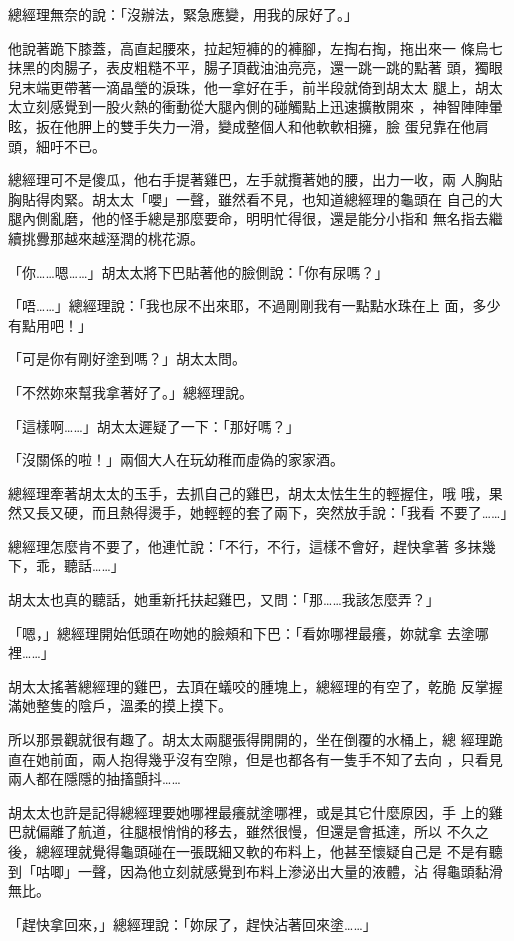 總經理無奈的說：「沒辦法，緊急應變，用我的尿好了。」

他說著跪下膝蓋，高直起腰來，拉起短褲的的褲腳，左掏右掏，拖出來一
條烏七抹黑的肉腸子，表皮粗糙不平，腸子頂截油油亮亮，還一跳一跳的點著
頭，獨眼兒末端更帶著一滴晶瑩的淚珠，他一拿好在手，前半段就倚到胡太太
腿上，胡太太立刻感覺到一股火熱的衝動從大腿內側的碰觸點上迅速擴散開來
，神智陣陣暈眩，扳在他胛上的雙手失力一滑，變成整個人和他軟軟相擁，臉
蛋兒靠在他肩頭，細吁不已。

總經理可不是傻瓜，他右手提著雞巴，左手就攬著她的腰，出力一收，兩
人胸貼胸貼得肉緊。胡太太「嚶」一聲，雖然看不見，也知道總經理的龜頭在
自己的大腿內側亂磨，他的怪手總是那麼要命，明明忙得很，還是能分小指和
無名指去繼續挑釁那越來越溼潤的桃花源。

「你……嗯……」胡太太將下巴貼著他的臉側說：「你有尿嗎？」

「唔……」總經理說：「我也尿不出來耶，不過剛剛我有一點點水珠在上
面，多少有點用吧！」

「可是你有剛好塗到嗎？」胡太太問。

「不然妳來幫我拿著好了。」總經理說。

「這樣啊……」胡太太遲疑了一下：「那好嗎？」

「沒關係的啦！」兩個大人在玩幼稚而虛偽的家家酒。

總經理牽著胡太太的玉手，去抓自己的雞巴，胡太太怯生生的輕握住，哦
哦，果然又長又硬，而且熱得燙手，她輕輕的套了兩下，突然放手說：「我看
不要了……」

總經理怎麼肯不要了，他連忙說：「不行，不行，這樣不會好，趕快拿著
多抹幾下，乖，聽話……」

胡太太也真的聽話，她重新托扶起雞巴，又問：「那……我該怎麼弄？」

「嗯，」總經理開始低頭在吻她的臉頰和下巴：「看妳哪裡最癢，妳就拿
去塗哪裡……」

胡太太搖著總經理的雞巴，去頂在蟻咬的腫塊上，總經理的有空了，乾脆
反掌握滿她整隻的陰戶，溫柔的摸上摸下。

所以那景觀就很有趣了。胡太太兩腿張得開開的，坐在倒覆的水桶上，總
經理跪直在她前面，兩人抱得幾乎沒有空隙，但是也都各有一隻手不知了去向
，只看見兩人都在隱隱的抽搐顫抖……

胡太太也許是記得總經理要她哪裡最癢就塗哪裡，或是其它什麼原因，手
上的雞巴就偏離了航道，往腿根悄悄的移去，雖然很慢，但還是會抵達，所以
不久之後，總經理就覺得龜頭碰在一張既細又軟的布料上，他甚至懷疑自己是
不是有聽到「咕唧」一聲，因為他立刻就感覺到布料上滲泌出大量的液體，沾
得龜頭黏滑無比。

「趕快拿回來，」總經理說：「妳尿了，趕快沾著回來塗……」

